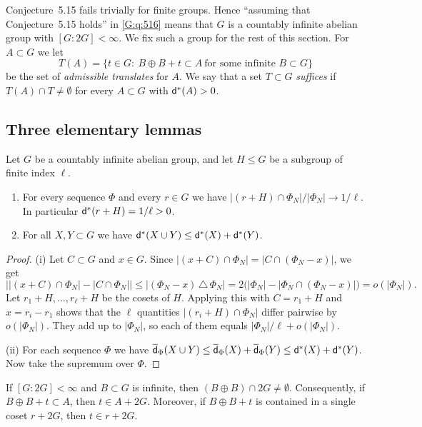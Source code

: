 Conjecture~5.15 fails trivially for finite groups. Hence ``assuming that Conjecture~5.15
holds'' in \cref{G:q:516} means that $G$ is a countably infinite abelian group with
$[G:2G]<\infty$. We fix such a group for the rest of this section. For $A\subset G$ we let
\[
T(A)=\{t\in G:\ B\oplus B+t\subset A\ \text{for some infinite } B\subset G\}
\]
be the set of \emph{admissible translates} for $A$. We say that a set $T\subset G$
\emph{suffices} if $T(A)\cap T\neq\emptyset$ for every $A\subset G$ with $\mathsf{d}^*(A)>0$.

\subsection{Three elementary lemmas}

\begin{lemma}\label{G:lem:density}
Let $G$ be a countably infinite abelian group, and let $H\le G$ be a subgroup of finite
index $\ell$.
\begin{enumerate}[label=\textup{(\roman*)}]
\item For every \Fol{} sequence $\Phi$ and every $r\in G$ we have
$|(r+H)\cap\Phi_N|/|\Phi_N|\to1/\ell$. In particular $\mathsf{d}^*(r+H)=1/\ell>0$.
\item For all $X,Y\subset G$ we have $\mathsf{d}^*(X\cup Y)\le\mathsf{d}^*(X)+\mathsf{d}^*(Y)$.
\end{enumerate}
\end{lemma}

\begin{proof}
(i) Let $C\subset G$ and $x\in G$. Since $|(x+C)\cap\Phi_N|=|C\cap(\Phi_N-x)|$, we get
\[
\big||(x+C)\cap\Phi_N|-|C\cap\Phi_N|\big|\le|(\Phi_N-x)\,\triangle\,\Phi_N|
=2\big(|\Phi_N|-|\Phi_N\cap(\Phi_N-x)|\big)=o(|\Phi_N|).
\]
Let $r_1+H,\dots,r_\ell+H$ be the cosets of $H$. Applying this with $C=r_1+H$ and
$x=r_i-r_1$ shows that the $\ell$ quantities $|(r_i+H)\cap\Phi_N|$ differ pairwise by
$o(|\Phi_N|)$. They add up to $|\Phi_N|$, so each of them equals
$|\Phi_N|/\ell+o(|\Phi_N|)$.

(ii) For each \Fol{} sequence $\Phi$ we have
$\overline{\mathsf{d}}_\Phi(X\cup Y)\le\overline{\mathsf{d}}_\Phi(X)+\overline{\mathsf{d}}_\Phi(Y)\le\mathsf{d}^*(X)+\mathsf{d}^*(Y)$. Now take
the supremum over $\Phi$.
\end{proof}

\begin{lemma}[Pigeonhole]\label{G:lem:pigeon}
If $[G:2G]<\infty$ and $B\subset G$ is infinite, then $(B\oplus B)\cap2G\neq\emptyset$.
Consequently, if $B\oplus B+t\subset A$, then $t\in A+2G$. Moreover, if
$B\oplus B+t$ is contained in a single coset $r+2G$, then $t\in r+2G$.
\end{lemma}

